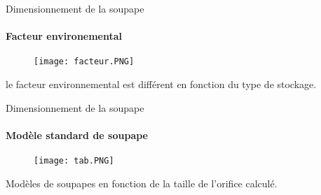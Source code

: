 \documentclass{beamer}
\begin{document}
\begin{frame}{Dimensionnement de la soupape}
\framesubtitle{Facteur environemental}
\begin{figure}[ht!]
\centering
\texttt{[image: facteur.PNG]}
\end{figure}
le facteur environnemental est différent en fonction du type de stockage.
\end{frame}

\begin{frame}{Dimensionnement de la soupape}
\framesubtitle{Modèle standard de soupape}
\begin{figure}[ht!]
\centering
\texttt{[image: tab.PNG]}
\end{figure}
Modèles de soupapes en fonction de la taille de l'orifice calculé.
\end{frame}
\end{document}
